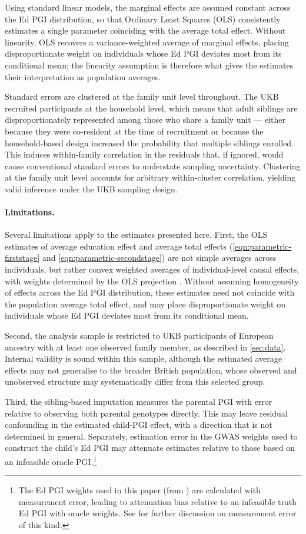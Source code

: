 Using standard linear models, the marginal effects are assumed constant across the Ed PGI distribution, so that Ordinary Least Squares (OLS) consistently estimates a single parameter coinciding with the average total effect.
Without linearity, OLS recovers a variance-weighted average of marginal effects, placing disproportionate weight on individuals whose Ed PGI deviates most from its conditional mean; the linearity assumption is therefore what gives the estimates their interpretation as population averages.

Standard errors are clustered at the family unit level throughout.
The UKB recruited participants at the household level, which means that adult siblings are disproportionately represented among those who share a family unit --- either because they were co-resident at the time of recruitment or because the household-based design increased the probability that multiple siblings enrolled. This induces within-family correlation in the residuals that, if ignored, would cause conventional standard errors to understate sampling uncertainty.
Clustering at the family unit level accounts for arbitrary within-cluster correlation, yielding valid inference under the UKB sampling design.

\paragraph{Limitations.}
Several limitations apply to the estimates presented here.
First, the OLS estimates of average education effect and average total effects (\autoref{eqn:parametric-firststage} and \eqref{eqn:parametric-secondstage}) are not simple averages across individuals, but rather convex weighted averages of individual-level causal effects, with weights determined by the OLS projection \citep{angrist1999}.
Without assuming homogeneity of effects across the Ed PGI distribution, these estimates need not coincide with the population average total effect, and may place disproportionate weight on individuals whose Ed PGI deviates most from its conditional mean.

Second, the analysis sample is restricted to UKB participants of European ancestry with at least one observed family member, as described in \autoref{sec:data}.
Internal validity is sound within this sample, although the estimated average effects may not generalise to the broader British population, whose observed and unobserved structure may systematically differ from this selected group.

Third, the sibling-based imputation measures the parental PGI with error relative to observing both parental genotypes directly.
This may leave residual confounding in the estimated child-PGI effect, with a direction that is not determined in general.
Separately, estimation error in the GWAS weights used to construct the child's Ed PGI may attenuate estimates relative to those based on an infeasible oracle PGI.\footnote{
    The Ed PGI weights used in this paper (from \citealt{okbay2022polygenic}) are calculated with measurement error, leading to attenuation bias relative to an infeasible truth Ed PGI with oracle weights.
    See \cite{van2023overcoming} for further discussion on measurement error of this kind.
}
